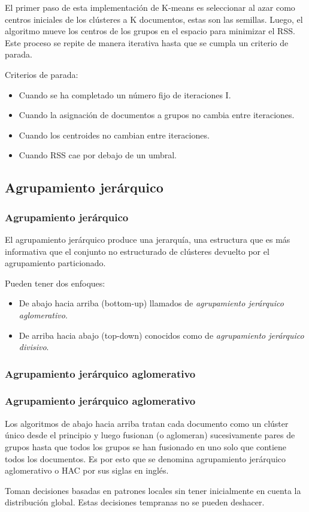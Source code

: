 \documentclass[t,compress,10pt,xcolor=dvipsnames]{beamer}
\begin{document}
{	\vspace{0.5em}
	El primer paso de esta implementaci\'on de K-means es seleccionar al azar como centros iniciales de los cl\'usteres a K documentos, estas son las semillas. Luego, el algoritmo mueve los centros de los grupos en el espacio para minimizar el RSS. Este proceso se repite de manera iterativa hasta que se cumpla un criterio de parada.
	
	\vspace{1em}
	Criterios de parada:
	\begin{itemize}
		\item Cuando se ha completado un número fijo de iteraciones I. 
		\item Cuando la asignación de documentos a grupos no cambia entre iteraciones.
		\item Cuando los centroides no cambian entre iteraciones.
		\item Cuando RSS cae por debajo de un umbral.
	\end{itemize}
}

	\subsection{Agrupamiento jer\'arquico}
	\frame
	{
		\frametitle{Agrupamiento jer\'arquico}
		\vspace{2em}
		El agrupamiento jerárquico produce una jerarquía, una estructura que es más informativa que el conjunto no estructurado de clústeres devuelto por el agrupamiento particionado.
		
		\vspace{1em}
		Pueden tener dos enfoques: 
		\begin{itemize}
			\item De abajo hacia arriba (bottom-up) llamados de \textit{agrupamiento jer\'arquico aglomerativo}. 
			\item De arriba hacia abajo (top-down) conocidos como de \textit{agrupamiento jer\'arquico divisivo}. 
		\end{itemize}
	}
	
	
	\subsubsection{Agrupamiento jer\'arquico aglomerativo}
	\frame
	{
		\frametitle{Agrupamiento jer\'arquico aglomerativo}
		\vspace{3em}
		Los algoritmos de abajo hacia arriba tratan cada documento como un clúster único desde el principio y luego fusionan (o aglomeran) sucesivamente pares de grupos hasta que todos los grupos se han fusionado en uno solo que contiene todos los documentos. 
		Es por esto que se denomina agrupamiento jerárquico aglomerativo o HAC por sus siglas en ingl\'es. 
		
		\vspace{1em}
		Toman decisiones basadas en patrones locales sin tener inicialmente en cuenta la distribución global. Estas decisiones tempranas no se pueden deshacer.
	}
\end{document}
